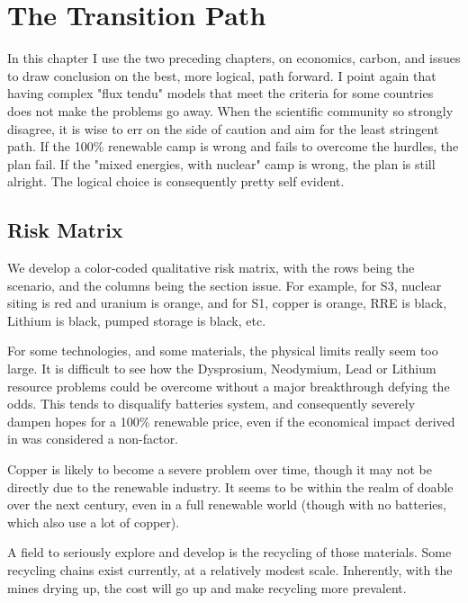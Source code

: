 \setchapterpreamble[u]{\margintoc}
\chapter{The Transition Path}

In this chapter I use the two preceding chapters, on economics, carbon, and issues to draw conclusion on the best, more logical, path forward. I point again that having complex "flux tendu" models that meet the criteria for some countries does not make the problems go away. When the scientific community so strongly disagree, it is wise to err on the side of caution and aim for the least stringent path. If the 100\% renewable camp is wrong and fails to overcome the hurdles, the plan fail. If the "mixed energies, with nuclear" camp is wrong, the plan is still alright. The logical choice is consequently pretty self evident.


\blindtext



\section{Risk Matrix}

We develop a color-coded qualitative risk matrix, with the rows being the scenario, and the columns being the section issue. For example, for S3, nuclear siting is red and uranium is orange, and for S1, copper is orange, RRE is black, Lithium is black, pumped storage is black, etc.

For some technologies, and some materials, the physical limits really seem too large. It is difficult to see how the Dysprosium, Neodymium, Lead or Lithium resource problems could be overcome without a major breakthrough defying the odds. This tends to disqualify batteries system, and consequently severely dampen hopes for a 100\% renewable price, even if the economical impact derived in  was considered a non-factor.

Copper is likely to become a severe problem over time, though it may not be directly due to the renewable industry. It seems to be within the realm of doable over the next century, even in a full renewable world (though with no batteries, which also use a lot of copper).

A field to seriously explore and develop is the recycling of those materials. Some recycling chains exist currently, at a relatively modest scale. Inherently, with the mines drying up, the cost will go up and make recycling more prevalent.


